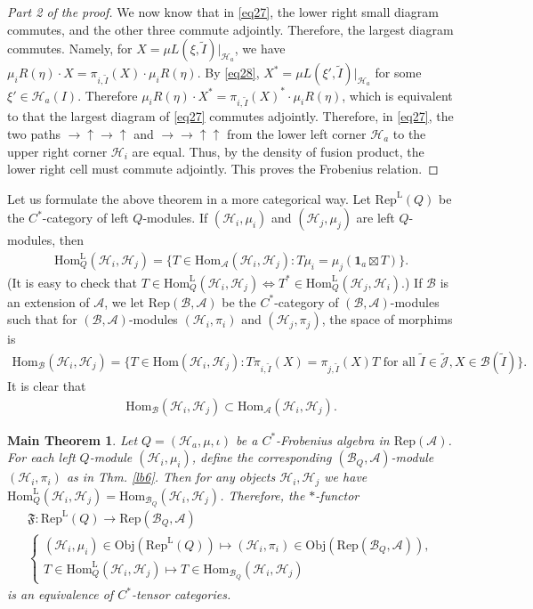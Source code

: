 \documentclass[12pt,a4paper,notitlepage]{article}
\theoremstyle{definition}
\theoremstyle{plain}
\newtheorem{Mthm}{Main Theorem}
\newcommand{\fk}{\mathfrak}
\newcommand{\mc}{\mathcal}
\newcommand{\wtd}{\widetilde}
\newcommand{\id}{\mathbf{1}}
\newcommand{\Hom}{\mathrm{Hom}}
\newcommand{\Rep}{\mathrm{Rep}}
\newcommand{\Jtd}{\widetilde{\mathcal J}}
\newcommand{\RepA}{\mathrm{Rep}(\mathcal A)}
\newcommand{\RepL}{\mathrm{Rep}^{\mathrm{L}}}
\newcommand{\HomL}{\mathrm{Hom}^{\mathrm{L}}}
\newcommand{\Obj}{\mathrm{Obj}}
\numberwithin{equation}{section}
\begin{document}
\begin{proof}[Part 2 of the proof]
We now know that in \eqref{eq27}, the lower right small diagram commutes, and the other three commute adjointly. Therefore, the largest diagram commutes. Namely, for $X=\mu L(\xi,\wtd I)|_{\mc H_a}$, we have $\mu_iR(\eta)\cdot  X=\pi_{i,\wtd I}(X)\cdot \mu_iR(\eta)$. By \eqref{eq28}, $X^*=\mu L(\xi',\wtd I)|_{\mc H_a}$ for some $\xi'\in\mc H_a(I)$. Therefore  $\mu_iR(\eta)\cdot X^*=\pi_{i,\wtd I}(X)^*\cdot \mu_iR(\eta)$, which is equivalent to that the largest diagram of \eqref{eq27} commutes adjointly. Therefore, in \eqref{eq27},  the two paths $\rightarrow \uparrow \rightarrow\uparrow$ and $\rightarrow \rightarrow \uparrow \uparrow$ from the lower left corner $\mc H_a$  to the upper right corner $\mc H_i$ are equal. Thus, by the density of fusion product, the lower right cell must commute adjointly. This proves the Frobenius relation.
\end{proof}


Let us formulate the above theorem in a more categorical way. Let $\RepL(Q)$ be the $C^*$-category of left $Q$-modules. If $(\mc H_i,\mu_i)$ and $(\mc H_j,\mu_j)$ are left $Q$-modules, then 
\begin{align*}
\HomL_Q(\mc H_i,\mc H_j)=\{T\in\Hom_{\mc A}(\mc H_i,\mc H_j):T\mu_i=\mu_j(\id_a\boxtimes T)\}.
\end{align*}
(It is easy to check that $T\in\HomL_Q(\mc H_i,\mc H_j)\Leftrightarrow T^*\in\HomL_Q(\mc H_j,\mc H_i)$.) If $\mc B$ is an extension of $\mc A$, we let $\Rep(\mc B,\mc A)$ be the $C^*$-category of $(\mc B,\mc A)$-modules such that for $(\mc B,\mc A)$-modules $(\mc H_i,\pi_i)$ and $(\mc H_j,\pi_j)$, the space of morphims is 
\begin{align*}
\Hom_{\mc B}(\mc H_i,\mc H_j)=\{T\in\Hom(\mc H_i,\mc H_j):T\pi_{i,\wtd I}(X)=\pi_{j,\wtd I}(X)T\text{ for all }\wtd I\in\Jtd,X\in\mc B(\wtd I)\}.	
\end{align*} 
It is clear that
\begin{align*}
\Hom_{\mc B}(\mc H_i,\mc H_j)\subset \Hom_{\mc A}(\mc H_i,\mc H_j).	
\end{align*}

\begin{Mthm}\label{lb12}
Let $Q=(\mc H_a,\mu,\iota)$ be a $C^*$-Frobenius algebra in $\RepA$. For each left $Q$-module $(\mc H_i,\mu_i)$, define the corresponding $(\mc B_Q,\mc A)$-module $(\mc H_i,\pi_i)$ as in Thm. \ref{lb6}. Then for any objects $\mc H_i,\mc H_j$ we have $\HomL_Q(\mc H_i,\mc H_j)=\Hom_{\mc B_Q}(\mc H_i,\mc H_j)$. Therefore, the $*$-functor 
\begin{gather*}
	\fk F:\RepL(Q)\rightarrow\Rep(\mc B_Q,\mc A)\\
	\left\{
\begin{array}{l}
(\mc H_i,\mu_i)\in\Obj(\RepL(Q))\mapsto (\mc H_i,\pi_i)\in\Obj(\Rep(\mc B_Q,\mc A)),\\[1ex]
T\in\HomL_Q(\mc H_i,\mc H_j)\mapsto  T\in\Hom_{\mc B_Q}(\mc H_i,\mc H_j)		
\end{array}	
	\right.
\end{gather*}
is an equivalence of $C^*$-tensor categories.
\end{Mthm}
\end{document}
